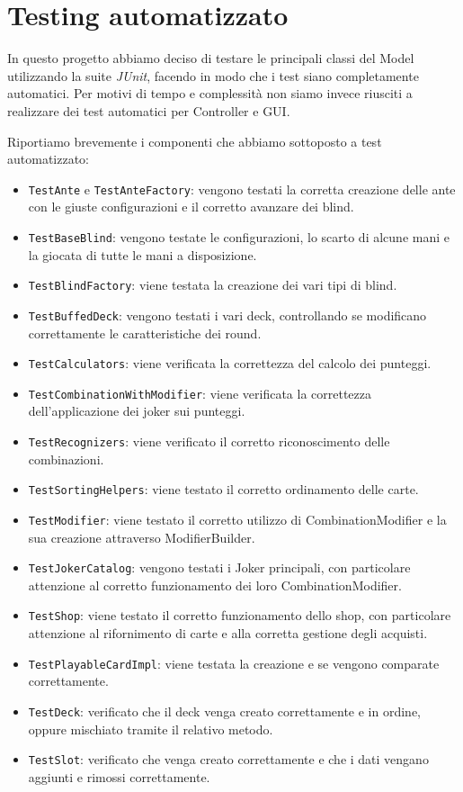 \documentclass[a4paper,12pt]{report}
\begin{document}
\section{Testing automatizzato}
In questo progetto abbiamo deciso di testare le principali classi del Model utilizzando la suite \textit{JUnit}, facendo in modo che i test siano completamente automatici. 
Per motivi di tempo e complessità non siamo invece riusciti a realizzare dei test automatici per Controller e GUI.

Riportiamo brevemente i componenti che abbiamo sottoposto a test automatizzato:
\begin{itemize}
	\item \texttt{TestAnte} e \texttt{TestAnteFactory}: vengono testati la corretta creazione delle ante con le giuste configurazioni e il corretto avanzare dei blind.
	\item \texttt{TestBaseBlind}: vengono testate le configurazioni, lo scarto di alcune mani e la giocata di tutte le mani a disposizione.
	\item \texttt{TestBlindFactory}: viene testata la creazione dei vari tipi di blind.
	\item \texttt{TestBuffedDeck}: vengono testati i vari deck, controllando se modificano correttamente le caratteristiche dei round.
	\item \texttt{TestCalculators}: viene verificata la correttezza del calcolo dei punteggi.
	\item \texttt{TestCombinationWithModifier}: viene verificata la correttezza dell'applicazione dei joker sui punteggi.
	\item \texttt{TestRecognizers}: viene verificato il corretto riconoscimento delle combinazioni.
	\item \texttt{TestSortingHelpers}: viene testato il corretto ordinamento delle carte.
	\item \texttt{TestModifier}: viene testato il corretto utilizzo di CombinationModifier e la sua creazione attraverso ModifierBuilder. 
	\item \texttt{TestJokerCatalog}: vengono testati i Joker principali, con particolare attenzione al corretto funzionamento dei loro CombinationModifier.
	\item \texttt{TestShop}: viene testato il corretto funzionamento dello shop, con particolare attenzione al rifornimento di carte e alla corretta gestione degli acquisti.
    \item \texttt{TestPlayableCardImpl}: viene testata la creazione e se vengono comparate correttamente.
    \item \texttt{TestDeck}: verificato che il deck venga creato correttamente e in ordine, oppure mischiato tramite il relativo metodo.
    \item \texttt{TestSlot}: verificato che venga creato correttamente e che i dati vengano aggiunti e rimossi correttamente.
\end{itemize}
\end{document}
